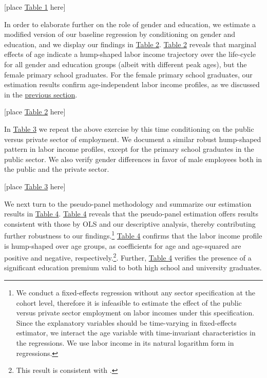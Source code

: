 \documentclass[12pt,author-year]{article}
\begin{document}
\begin{center}
	[place \hyperref[table1]{Table 1} here]
\end{center}

In order to elaborate further on the role of gender and education, we estimate a modified version of our baseline regression by conditioning on gender and education, and we display our findings in \hyperref[table2]{Table 2}. \hyperref[table2]{Table 2} reveals that marginal effects of age indicate a hump-shaped labor income trajectory over the life-cycle for all gender and education groups (albeit with different peak ages), but the female primary school graduates. For the female primary school graduates, our estimation results confirm age-independent labor income profiles, as we discussed in the \hyperref[Section3]{previous section}.

\begin{center}
	[place \hyperref[table2]{Table 2} here]
\end{center}

In \hyperref[table3]{Table 3} we repeat the above exercise by this time conditioning on the public versus private sector of employment. We document a similar robust hump-shaped pattern in labor income profiles, except for the primary school graduates in the public sector. We also verify gender differences in favor of male employees both in the public and the private sector.     

\begin{center}
	[place \hyperref[table3]{Table 3} here]
\end{center}


We next turn to the pseudo-panel methodology and summarize our estimation results in \hyperref[table4]{Table 4}. \hyperref[table4]{Table 4} reveals that the pseudo-panel estimation offers results consistent with those by OLS and our descriptive analysis, thereby contributing further robustness to our findings.\footnote{We conduct a fixed-effects regression without any sector specification at the cohort level, therefore it is infeasible to estimate the effect of the public versus private sector employment on labor incomes under this specification. Since the explanatory variables should be time-varying in fixed-effects estimator, we interact the age variable with time-invariant characteristics in the regressions. We use labor income in its natural logarithm form in regressions.} \hyperref[table4]{Table 4} confirms that the labor income profile is hump-shaped over age groups, as coefficients for age and age-squared are positive and negative, respectively.\footnote{This result is consistent with \cite{Tansel05}.}. Further, \hyperref[table4]{Table 4} verifies the presence of a significant education premium valid to both high school and university graduates. 
\end{document}
